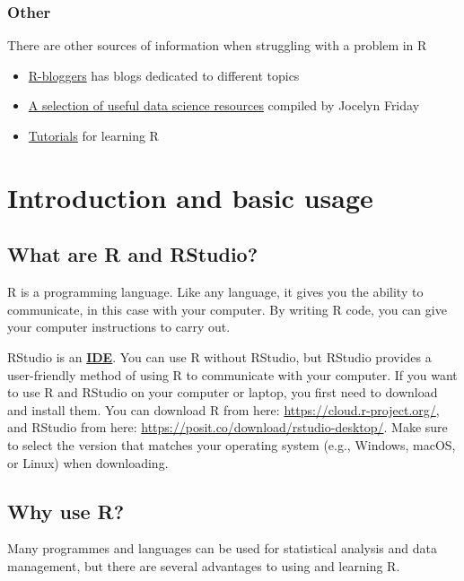 \documentclass[
]{book}
\providecommand{\tightlist}{%
  \setlength{\itemsep}{0pt}\setlength{\parskip}{0pt}}
\begin{document}
\subsection{Other}\label{sec:OtherUsefulResources}

There are other sources of information when struggling with a problem in R

\begin{itemize}
\tightlist
\item
  \href{https://www.r-bloggers.com/}{R-bloggers} has blogs dedicated to different topics
\item
  \href{https://github.com/jocelynfriday/UsefulDataSceinceResources}{A selection of useful data science resources} compiled by Jocelyn Friday
\item
  \href{https://www.w3schools.com/r/}{Tutorials} for learning R
\end{itemize}

\chapter{Introduction and basic usage}\label{ch-2}

\section{What are R and RStudio?}\label{what-are-r-and-rstudio}

R is a programming language. Like any language, it gives you the ability to communicate, in this case with your computer. By writing R code, you can give your computer instructions to carry out.

RStudio is an \textbf{\hyperref[acronyms_IDE]{IDE}}. You can use R without RStudio, but RStudio provides a user-friendly method of using R to communicate with your computer. If you want to use R and RStudio on your computer or laptop, you first need to download and install them. You can download R from here: \url{https://cloud.r-project.org/}, and RStudio from here: \url{https://posit.co/download/rstudio-desktop/}. Make sure to select the version that matches your operating system (e.g., Windows, macOS, or Linux) when downloading.

\section{Why use R?}\label{why-use-r}

Many programmes and languages can be used for statistical analysis and data management, but there are several advantages to using and learning R.
\end{document}
